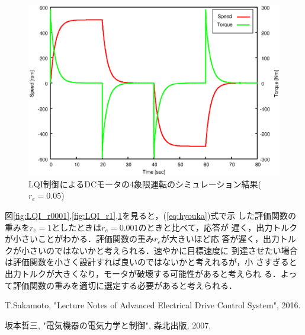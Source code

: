 \documentclass[a4paper,12pt]{jarticle}
\begin{document}
%
%
\begin{figure}[htbp]
 \begin{center}
  \includegraphics[width = 150mm]{fig/LQI_r005.eps}
 \end{center}
 \caption{LQI制御によるDCモータの4象限運転のシミュレーション結果($r_e=0.05$)}
 \label{fig:LQI_r005}
\end{figure}
%
%
図\ref{fig:LQI_r0001},\ref{fig:LQI_r1},\ref{fig:LQI_r005}を見ると，(\ref{eq:hyouka})式で示
した評価関数の重みを$r_e=1$としたときは$r_e=0.001$のときと比べて，応答が
遅く，出力トルクが小さいことがわかる．評価関数の重み$r_e$が大きいほど応
答が遅く，出力トルクが小さいのではないかと考えられる．速やかに目標速度に
到達させたい場合は評価関数を小さく設計すれば良いのではないかと考えれるが，小
さすぎると出力トルクが大きくなり，モータが破壊する可能性があると考えられ
る．よって評価関数の重みを適切に選定する必要があると考えられる．

 
%
%
%

%
\begin{thebibliography}{99}

  T.Sakamoto,
		 "Lecture Notes of Advanced Electrical Drive Control System", 2016.

  坂本哲三, "電気機器の電気力学と制御", 森北出版, 2007.

\end{thebibliography}
\end{document}
